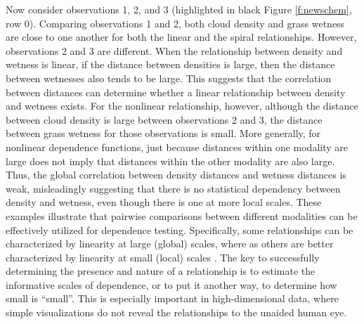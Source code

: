 \documentclass[11pt]{article}
\begin{document}
Now consider observations  1, 2, and 3 (highlighted in black Figure \ref{f:newschem}, row 0).  Comparing observations 1 and 2, both cloud density and grass wetness are close to one another for both the linear  and the  spiral relationships. 
However,  observations 2 and 3 are different.  When the relationship between density and wetness is linear, if the distance between densities is large, then the distance between wetnesses also tends to be large.  This suggests that the correlation between distances can determine whether a linear relationship between density and wetness exists.  
For the nonlinear relationship, however, although the distance between cloud density is large between observations 2 and 3, the distance between grass wetness for those observations is small. 
More generally, for nonlinear dependence functions, just because distances within one modality are large does not imply that distances within the other modality are also large. 
Thus, the global correlation between density distances and wetness distances is weak, misleadingly suggesting that there is no statistical dependency between density and wetness, even though there is one at more local scales.  
These examples illustrate that pairwise comparisons between different modalities can be effectively utilized for dependence testing.
Specifically, some relationships can be characterized by linearity at large (global) scales, where as others are better characterized by linearity at small (local) scales \cite{Allard2012}.
The key to successfully determining the presence and nature of a relationship is to estimate the informative scales of dependence, or to put it another way, to determine how small is ``small''. This is especially important in high-dimensional data, where simple visualizations do not reveal the relationships to the unaided human eye.
\end{document}
